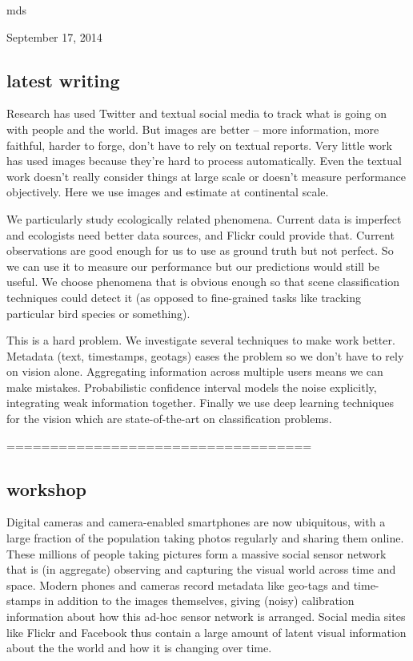 \documentclass[10pt,journal,compsoc]{IEEEtran}
\begin{document}
\hfill mds
 
\hfill September 17, 2014

\hfill \break
\hfill \break
\subsection*{latest writing}
\hfill \break
\hfill \break

Research has used Twitter and textual social media to track what is going on with people and the world. But images are better -- more information, more faithful, harder to forge, don't have to rely on textual reports. Very little work has used images because they're hard to process automatically. Even the textual work doesn't really consider things at large scale or doesn't measure performance objectively. Here we use images and estimate at continental scale.

We particularly study ecologically related phenomena. Current data is imperfect and ecologists need better data sources, and Flickr could provide that. Current observations are good enough for us to use as ground truth but not perfect. So we can use it to measure our performance but our predictions would still be useful. We choose phenomena that is obvious enough so that scene classification techniques could detect it (as opposed to fine-grained tasks like tracking particular bird species or something).

This is a hard problem. We investigate several techniques to make work better. Metadata (text, timestamps, geotags) eases the problem so we don't have to rely on vision alone. Aggregating information across multiple users means we can make mistakes. Probabilistic confidence interval models the noise explicitly, integrating weak information together. Finally we use deep learning techniques for the vision which are state-of-the-art on classification problems.

\hfill \break
\hfill \break
===================================
\hfill \break
\hfill \break
\subsection*{workshop}

Digital cameras and camera-enabled smartphones are now ubiquitous,
with a large fraction of the population taking photos regularly and
sharing them online. These millions of people taking pictures form a
massive social sensor network that is (in aggregate)
observing and capturing the visual world across time and space.
Modern phones and cameras record metadata like geo-tags and
time-stamps in addition to the images themselves, giving (noisy)
calibration information about how this ad-hoc sensor network is arranged.
%
Social media sites like Flickr and Facebook
thus contain a large amount of latent visual information about
the the world and how it is changing over time. 
\end{document}
